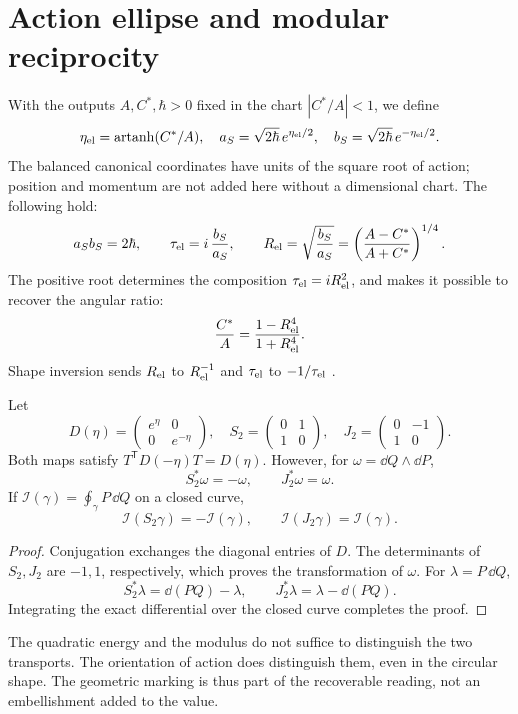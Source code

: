 \section{Action ellipse and modular reciprocity}
\label{sec:ellipse}
With the outputs $A,C^*,\hbar>0$ fixed in the chart
$|C^*/A|<1$, we define
\[
\eta_{\rm el}=\operatorname{artanh}(C^*/A),\quad
a_S=\sqrt{2\hbar}\,e^{\eta_{\rm el}/2},\quad
b_S=\sqrt{2\hbar}\,e^{-\eta_{\rm el}/2}.
\]
The balanced canonical coordinates have units of the square root of action;
position and momentum are not added here without a dimensional chart.
The following hold:
\[
a_Sb_S=2\hbar,\qquad
\tau_{\rm el}=i\,\frac{b_S}{a_S},\qquad
R_{\rm el}=\sqrt{\frac{b_S}{a_S}}
=\left(\frac{A-C^*}{A+C^*}\right)^{1/4}.
\]
The positive root determines the composition $\tau_{\rm el}=iR_{\rm el}^2$,
and makes it possible to recover the angular ratio:
\[
\frac{C^*}{A}=\frac{1-R_{\rm el}^4}{1+R_{\rm el}^4}.
\]
Shape inversion sends $R_{\rm el}$ to $R_{\rm el}^{-1}$ and
$\tau_{\rm el}$ to $-1/\tau_{\rm el}$ \cite{elipse}.

\begin{proposition}
Let
\[
D(\eta)=\begin{pmatrix}e^\eta&0\\0&e^{-\eta}\end{pmatrix},
\quad
S_2=\begin{pmatrix}0&1\\1&0\end{pmatrix},
\quad
J_2=\begin{pmatrix}0&-1\\1&0\end{pmatrix}.
\]
Both maps satisfy $T^{\mathsf T}D(-\eta)T=D(\eta)$.
However, for $\omega=\dd Q\wedge\dd P$,
\[
S_2^*\omega=-\omega,\qquad J_2^*\omega=\omega.
\]
If $\mathcal I(\gamma)=\oint_\gamma P\,\dd Q$ on a closed curve,
\[
\mathcal I(S_2\gamma)=-\mathcal I(\gamma),\qquad
\mathcal I(J_2\gamma)=\mathcal I(\gamma).
\]
\end{proposition}
\begin{proof}
Conjugation exchanges the diagonal entries of $D$.
The determinants of $S_2,J_2$ are $-1,1$, respectively, which
proves the transformation of $\omega$. For $\lambda=P\,\dd Q$,
\[
S_2^*\lambda=\dd(PQ)-\lambda,\qquad
J_2^*\lambda=\lambda-\dd(PQ).
\]
Integrating the exact differential over the closed curve completes the proof.
\end{proof}

The quadratic energy and the modulus do not suffice to distinguish the two
transports. The orientation of action does distinguish them, even
in the circular shape. The geometric marking is thus part of the recoverable
reading, not an embellishment added to the value.
